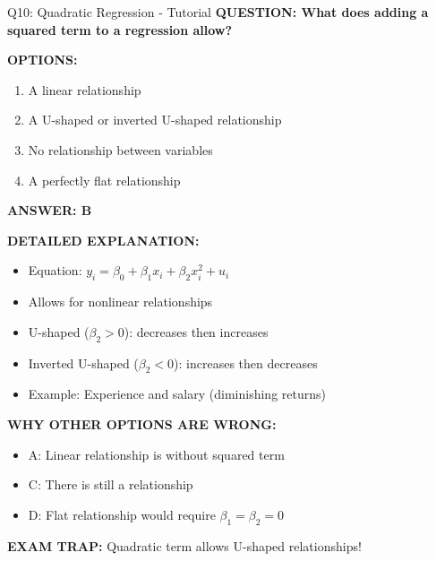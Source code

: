 \documentclass[8pt]{beamer}
\begin{document}
	\begin{frame}{Q10: Quadratic Regression - Tutorial}
		\fontsize{6.5}{7.5}\selectfont
		\textbf{QUESTION: What does adding a squared term to a regression allow?}
		
		\vspace{0.1cm}
		\textbf{OPTIONS:}
		\begin{enumerate}
			\item A linear relationship
			\item A U-shaped or inverted U-shaped relationship
			\item No relationship between variables
			\item A perfectly flat relationship
		\end{enumerate}
		
		\vspace{0.1cm}
		\textcolor{myblue}{\textbf{ANSWER: B}}
		
		\vspace{0.1cm}
		\textbf{DETAILED EXPLANATION:}
		\begin{itemize}
			\item Equation: $y_i = \beta_0 + \beta_1 x_i + \beta_2 x_i^2 + u_i$
			\item Allows for nonlinear relationships
			\item U-shaped ($\beta_2 > 0$): decreases then increases
			\item Inverted U-shaped ($\beta_2 < 0$): increases then decreases
			\item Example: Experience and salary (diminishing returns)
		\end{itemize}
		
		\vspace{0.1cm}
		\textcolor{myred}{\textbf{WHY OTHER OPTIONS ARE WRONG:}}
		\begin{itemize}
			\item \textcolor{myred}{A:} Linear relationship is without squared term
			\item \textcolor{myred}{C:} There is still a relationship
			\item \textcolor{myred}{D:} Flat relationship would require $\beta_1 = \beta_2 = 0$
		\end{itemize}
		
		\textcolor{myred}{\textbf{EXAM TRAP:}} Quadratic term allows \textcolor{myblue}{U-shaped relationships}!
	\end{frame}
	
	
\end{document}
